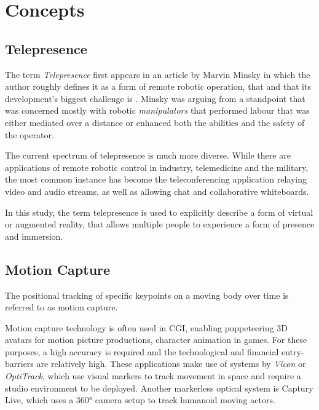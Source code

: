 \chapter{Concepts}

\section{Telepresence}

The term \emph{Telepresence} first appears in an article by Marvin Minsky in which the author roughly defines it as a form of remote robotic operation, that  and that its development's biggest challenge is  \parencite{minskyTelepresence}. Minsky was arguing from a standpoint that was concerned mostly with robotic \emph{manipulators} that performed labour that was either mediated over a distance or enhanced both the abilities and the safety of the operator.

The current spectrum of telepresence is much more diverse. While there are applications of remote robotic control in industry, telemedicine and the military, the most common instance has become the teleconferencing application relaying video and audio streams, as well as allowing chat and collaborative whiteboards.
	
In this study, the term telepresence is used to explicitly describe a form of virtual or augmented reality, that allows multiple people to experience a form of presence and immersion.

\section{Motion Capture}

The positional tracking of specific keypoints on a moving body over time is referred to as motion capture.

Motion capture technology is often used in CGI, enabling puppeteering 3D avatars for motion picture productions, character animation in games. For these purposes, a high accuracy is required and the technological and financial entry-barriers are relatively high. These applications make use of systems by \emph{Vicon} or \emph{OptiTrack}, which use visual markers to track movement in space and require a studio environment to be deployed. Another markerless optical system is Captury Live, which uses a 360° camera setup to track humanoid moving actors.

